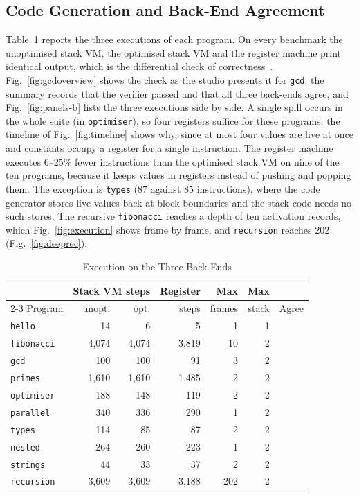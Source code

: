 \documentclass[conference]{IEEEtran}
\newcommand{\cmark}{\ding{51}}
\newcommand{\code}[1]{\texttt{#1}}
\begin{document}
\subsection{Code Generation and Back-End Agreement}
\label{sec:res-backends}
Table~\ref{tab:backends} reports the three executions of each program. On every benchmark the unoptimised stack VM, the optimised stack VM and the register machine print identical output, which is the differential check of correctness~\cite{mckeeman1998}. Fig.~\ref{fig:gcdoverview} shows the check as the studio presents it for \code{gcd}: the summary records that the verifier passed and that all three back-ends agree, and Fig.~\ref{fig:panels-b} lists the three executions side by side. A single spill occurs in the whole suite (in \code{optimiser}), so four registers suffice for these programs; the timeline of Fig.~\ref{fig:timeline} shows why, since at most four values are live at once and constants occupy a register for a single instruction. The register machine executes 6--25\% fewer instructions than the optimised stack VM on nine of the ten programs, because it keeps values in registers instead of pushing and popping them. The exception is \code{types} (87 against 85 instructions), where the code generator stores live values back at block boundaries and the stack code needs no such stores. The recursive \code{fibonacci} reaches a depth of ten activation records, which Fig.~\ref{fig:execution} shows frame by frame, and \code{recursion} reaches 202 (Fig.~\ref{fig:deeprec}).

\begin{table}[!tbp]
\caption{Execution on the Three Back-Ends}
\label{tab:backends}
\centering
\footnotesize
\setlength{\tabcolsep}{3.4pt}
\begin{tabular}{@{}l r r r r r c@{}}
\toprule
& \multicolumn{2}{c}{Stack VM steps} & Register & Max & Max & \\
\cmidrule(lr){2-3}
Program & unopt. & opt. & steps & frames & stack & Agree \\
\midrule
\code{hello} & 14 & 6 & 5 & 1 & 1 & \cmark \\
\code{fibonacci} & 4,074 & 4,074 & 3,819 & 10 & 2 & \cmark \\
\code{gcd} & 100 & 100 & 91 & 3 & 2 & \cmark \\
\code{primes} & 1,610 & 1,610 & 1,485 & 2 & 2 & \cmark \\
\code{optimiser} & 188 & 148 & 119 & 2 & 2 & \cmark \\
\code{parallel} & 340 & 336 & 290 & 1 & 2 & \cmark \\
\code{types} & 114 & 85 & 87 & 2 & 2 & \cmark \\
\code{nested} & 264 & 260 & 223 & 1 & 2 & \cmark \\
\code{strings} & 44 & 33 & 37 & 2 & 2 & \cmark \\
\code{recursion} & 3,609 & 3,609 & 3,188 & 202 & 2 & \cmark \\
\bottomrule
\end{tabular}
\end{table}
\end{document}

